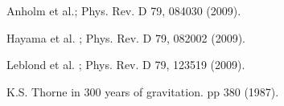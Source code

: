 \documentclass[prd,floatfix,preprintnumbers,amsmath,amssymb,nofootinbib,superscriptaddress]{revtex4}
\begin{document}
\begin{thebibliography}{}

 Anholm et al.; Phys. Rev. D 79, 084030 (2009).

 Hayama et al. ; Phys. Rev. D 79, 082002 (2009).

 Leblond et al. ; Phys. Rev. D 79, 123519 (2009).
   
 K.S. Thorne in 300 years of gravitation. pp 380 (1987).

\end{thebibliography}
\end{document}

